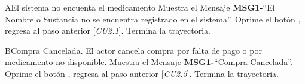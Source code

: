 		\begin{UCtrayectoriaA}{A}{El sistema no encuenta el medicamento}
			\UCpaso Muestra el Mensaje {\bf MSG1-}``El Nombre o Sustancia  no se encuentra registrado en el sistema''.
			\UCpaso[\UCactor] Oprime el botón , regresa al paso anterior [{\em CU2.1}].  
			\UCpaso[] Termina la trayectoria.
		\end{UCtrayectoriaA}
		
		
	\begin{UCtrayectoriaB}{B}{Compra Cancelada.}
			\UCpaso[\UCactor]El actor cancela compra por falta de pago o por medicamento no disponible.
			\UCpaso Muestra el Mensaje {\bf MSG1-}``Compra Cancelada''.
			\UCpaso[\UCactor] Oprime el botón , regresa al paso anterior [{\em CU2.5}].  
			\UCpaso[] Termina la trayectoria.
		\end{UCtrayectoriaB}
		
